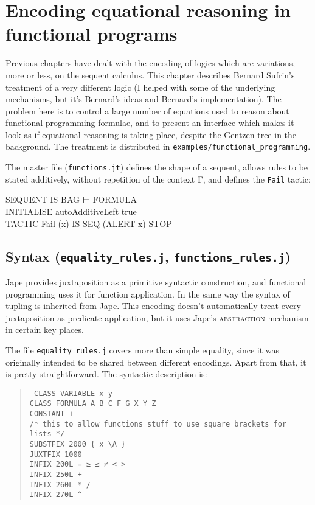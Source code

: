 \chapter{Encoding equational reasoning in functional programs}
\label{chap:funcprog}

Previous chapters have dealt with the encoding of logics which are variations, more or less, on the sequent calculus. This chapter describes Bernard Sufrin's treatment of a very different logic (I helped with some of the underlying mechanisms, but it's Bernard's ideas and Bernard's implementation). The problem here is to control a large number of equations used to reason about functional-programming formulae, and to present an interface which makes it look as if equational reasoning is taking place, despite the Gentzen tree in the background. The treatment is distributed in \texttt{examples/functional\_programming}.

The master file (\texttt{functions.jt}) defines the shape of a sequent, allows rules to be stated additively, without repetition of the context Γ, and defines the \texttt{Fail} tactic:
\begin{japeish}
SEQUENT IS BAG ⊢ FORMULA \\
INITIALISE autoAdditiveLeft true \\
TACTIC Fail (x) IS SEQ (ALERT x) STOP
\end{japeish}

\section{Syntax (\texttt{equality\_rules.j}, \texttt{functions\_rules.j})}

Jape provides juxtaposition as a primitive syntactic construction, and functional programming uses it for function application. In the same way the syntax of tupling is inherited from Jape. This encoding doesn't automatically treat every juxtaposition as predicate application, but it uses Jape's \textsc{abstraction} mechanism in certain key places.

The file \texttt{equality\_rules.j} covers more than simple equality, since it was originally intended to be shared between different encodings. Apart from that, it is pretty straightforward. The syntactic description is:
\begin{quote}\tt\small
CLASS VARIABLE x y \\
CLASS FORMULA A B C F G X Y Z \\
CONSTANT ⊥ \\
 
/* this to allow functions stuff to use square brackets for lists */ \\
SUBSTFIX    2000 \{ x \textbackslash A \} \\
JUXTFIX 1000 \\
INFIX       200L    = ≥ ≤ ≠ < > \\
INFIX       250L    + - \\
INFIX       260L    * / \\
INFIX       270L    \textasciicircum \\
\end{quote}

